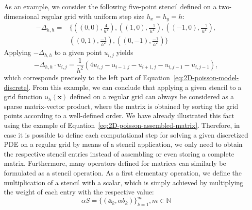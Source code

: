 As an example, we consider the following five-point stencil defined on a two-dimensional regular grid with uniform step size $h_x = h_y = h$:
\begin{equation}
	\begin{split}
		-\Delta_{h,h} = & \bigg\{ \left( \left( 0,0 \right), \frac{4}{h^2}\right), \left(\left(1,0\right), \frac{-1}{h^2}\right), \left(\left(-1,0\right), \frac{-1}{h^2}\right), \\ & \left(\left(0,1\right), \frac{-1}{h^2}\right), \left(\left(0,-1\right), \frac{-1}{h^2}\right) \bigg\}
	\end{split}
	\label{eq:five-point-stencil}
\end{equation}
Applying $-\Delta_{h,h}$ to a given point $u_{i,j}$ yields 
\begin{equation}
	-\Delta_{h,h} \cdot u_{i,j} = \frac{1}{h^2} \left(4 u_{i,j}  - u_{i-1,j} - u_{i+1,j} - u_{i,j-1} - u_{i,j-1}\right),
\end{equation}
which corresponds precisely to the left part of Equation~\eqref{eq:2D-poisson-model-discrete}.
From this example, we can conclude that applying a given stencil to a grid function $u_h(\bm{x})$ defined on a regular grid can always be considered as a sparse matrix-vector product, where the matrix is obtained by sorting the grid points according to a well-defined order.
We have already illustrated this fact using the example of Equation~\eqref{eq:2D-poisson-assembled-matrix}.
Therefore, in case it is possible to define each computational step for solving a given discretized PDE on a regular grid by means of a stencil application, we only need to obtain the respective stencil entries instead of assembling or even storing a complete matrix.
Furthermore, many operators defined for matrices can similarly be formulated as a stencil operation.
As a first elementary operation, we define the multiplication of a stencil with a scalar, which is simply achieved by multiplying the weight of each entry with the respective value:
\begin{equation}
	\alpha S = \{(\bm{a}_k, \alpha b_k) \}_{k=1}^m, m \in \mathbb{N}
\end{equation}

